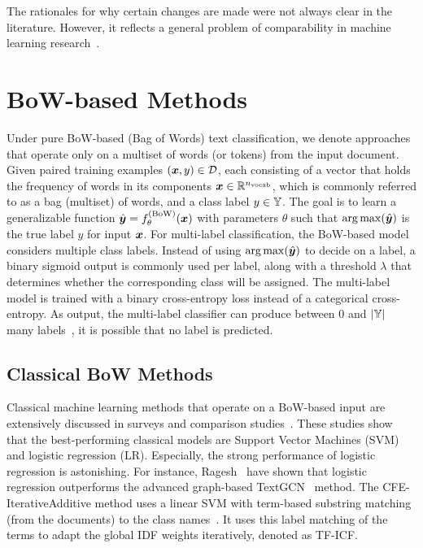 \documentclass[lettersize,journal]{IEEEtran}
\begin{document}
The rationales for why certain changes are made were not always clear in the literature.
However, it reflects a general problem of comparability in machine learning research~\cite{leech2024questionablepracticesmachinelearning}.

\section{BoW-based Methods}\label{sec:bow}
Under pure BoW-based (Bag of Words) text classification, we denote approaches that operate only on a multiset of words (or tokens) from the input document. 
Given paired training examples $({\bm{x}},y) \in \mathcal{D}$, each consisting of a vector that holds the frequency of words in its components ${\bm{x}} \in {\mathbb{R}}^{n_\mathrm{vocab}}$, which is commonly referred to as a bag (multiset) of words, and a class label $y \in {\mathbb{Y}}$. 
The goal is to learn a generalizable function $\hat{{\bm{y}}} = f_\theta^{(\mathrm{BoW})}({\bm{x}})$ with parameters $\theta$ such that $\operatorname{arg\,max}(\hat{{\bm{y}}})$ is the true label $y$ for input ${\bm{x}}$.
For multi-label classification, the BoW-based model considers multiple class labels. 
Instead of using $\operatorname{arg\,max}(\hat{{\bm{y}}})$ to decide on a label, a binary sigmoid output is commonly used per label, along with a threshold $\lambda$ that determines whether the corresponding class will be assigned. 
The multi-label model is trained with a binary cross-entropy loss instead of a categorical cross-entropy.
As output, the multi-label classifier can produce between $0$ and $|{\mathbb{Y}}|$ many labels~\cite{DBLP:journals/csur/Sebastiani02}, \ie it is possible that no label is predicted.

\subsection{Classical BoW Methods}

Classical machine learning methods that operate on a BoW-based input are extensively discussed in surveys and comparison studies~\cite{
DBLP:conf/wsdm/RageshSIBL21,
DBLP:journals/information/KowsariMHMBB19,
DBLP:journals/air/Kadhim19,
DBLP:conf/kcap/GalkeMSBS17}.
These studies show that the best-performing classical models are Support Vector Machines (SVM) and logistic regression (LR).
Especially, the strong performance of logistic regression is astonishing.
For instance, Ragesh~\etal\cite{DBLP:conf/wsdm/RageshSIBL21} have shown that logistic regression outperforms the advanced graph-based TextGCN~\cite{DBLP:conf/aaai/YaoM019} method. 
The CFE-IterativeAdditive method uses a linear SVM with term-based substring matching (from the documents) to the class names~\cite{ATTIEH2023110215}.
It uses this label matching of the terms to adapt the global IDF weights iteratively, denoted as TF-ICF.
\end{document}
